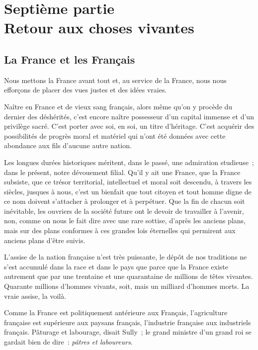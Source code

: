 \documentclass[french,twoside]{book} %
\newcommand{\astermono}{\medskip\centerline{\color{rubric}\large\selectfont{\syms ✻}}\medskip\par}%
\newcommand\chapteropen{} %
\newcommand\chaptercont{} %
\begin{document}
\chapteropen
\chapter[Septième partie. Retour aux choses vivantes]{Septième partie \\
Retour aux choses vivantes}\renewcommand{\leftmark}{Septième partie \\
Retour aux choses vivantes}


\chaptercont
\section[La France et les Français]{La France et les Français}
\noindent Nous mettons la France avant tout et, au service de la France, nous nous efforçons de placer des vues justes et des idées vraies.\par
Naître en France et de vieux sang français, alors même qu’on y procède du dernier des déshérités, c’est encore naître possesseur d’un capital immense et d’un privilège sacré. C’est porter avec soi, en soi, un titre d’héritage. C’est acquérir des possibilités de progrès moral et matériel qui n’ont été données avec cette abondance aux fils d’aucune autre nation.\par

\astermono

\noindent Les longues durées historiques méritent, dans le passé, une admiration studieuse ; dans le présent, notre dévouement filial. Qu’il y ait une France, que la France subsiste, que ce trésor territorial, intellectuel et moral soit descendu, à travers les siècles, jusques à nous, c’est un bienfait que tout citoyen et tout homme digne de ce nom doivent s’attacher à prolonger et à perpétuer. Que la fin de chacun soit inévitable, les ouvriers de la société future ont le devoir de travailler à l’avenir, non, comme on nous le fait dire avec une rare sottise, d’après les anciens plans, mais sur des plans conformes à ces grandes lois éternelles qui permirent aux anciens plans d’être suivis.\par

\astermono

\noindent L’assise de la nation française n’est très puissante, le dépôt de nos traditions ne s’est accumulé dans la race et dans le pays que parce que la France existe autrement que par une trentaine et une quarantaine de millions de têtes vivantes. Quarante millions d’hommes vivants, soit, mais un milliard d’hommes morts. La vraie assise, la voilà.\par
Comme la France est politiquement antérieure aux Français, l’agriculture française est supérieure aux paysans français, l’industrie française aux industriels français. Pâturage et labourage, disait Sully ; le grand ministre d’un grand roi se gardait bien de dire : \emph{pâtres et laboureurs}.
\end{document}
